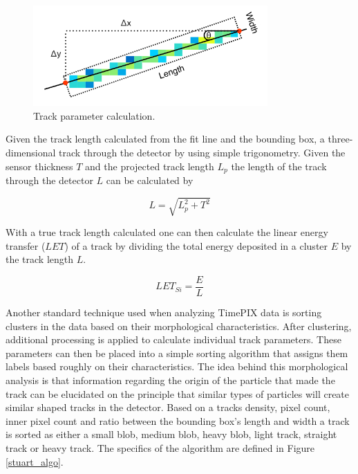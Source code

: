 \begin{figure}[H]
	\begin{center}
	\includegraphics[width=0.8\textwidth]{figures/density.png}
	\caption{Track parameter calculation.\cite{stuartthesis}}
	\label{track_analysis}
	\end{center}
\end{figure}

Given the track length calculated from the fit line and the bounding box, a three-dimensional track through the detector by using simple trigonometry. Given the sensor thickness $T$ and the projected track length $L_{p}$ the length of the track through the detector $L$ can be calculated by

\[L = \sqrt{L_{p}^{2} + T^{2}} \]

With a true track length calculated one can then calculate the linear energy transfer ($LET$) of a track by dividing the total energy deposited in a cluster $E$ by the track length $L$.

\[LET_{Si} = \frac{E}{L}\]

Another standard technique used when analyzing TimePIX data is sorting clusters in the data based on their morphological characteristics. After clustering, additional processing is applied to calculate individual track parameters. These parameters can then be placed into a simple sorting algorithm that assigns them labels based roughly on their characteristics. The idea behind this morphological analysis is that information regarding the origin of the particle that made the track can be elucidated on the principle that similar types of particles will create similar shaped tracks in the detector. Based on a tracks density, pixel count, inner pixel count and ratio between the bounding box's length and width a track is sorted as either a small blob, medium blob, heavy blob, light track, straight track or heavy track. The specifics of the algorithm are defined in Figure \ref{stuart_algo}.

